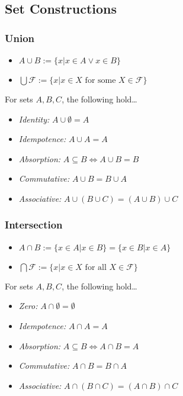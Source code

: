 \subsection{Set Constructions}\label{setconstructions}

\subsubsection{Union}\label{union}
\begin{itemize}
  \item $A\cup B := \{x | x \in A \lor x \in B \}$
  \item $\bigcup \mathcal{F} := \{x | x \in X \textrm{ for some } X \in \mathcal{F} \}$
\end{itemize}

\begin{proposition}
For sets $A,B,C$, the following hold\dots
\begin{itemize}
  \item \emph{Identity:} $A \cup \emptyset = A$
  \item \emph{Idempotence:} $A\cup A = A$
  \item \emph{Absorption:} $A \subseteq B \Leftrightarrow A \cup B = B$
  \item \emph{Commutative:} $A \cup B = B \cup A$
  \item \emph{Associative:} $A \cup (B \cup C) = (A \cup B) \cup C$
\end{itemize}
\end{proposition}
	
\subsubsection{Intersection}\label{intersection}
\begin{itemize}
  \item $A\cap B := \{x \in A | x \in B\} = \{x \in B | x \in A\}$
  \item $\bigcap \mathcal{F} := \{x | x \in X \textrm{ for all } X \in \mathcal{F} \}$
\end{itemize}

\begin{proposition}
For sets $A,B,C$, the following hold\dots
\begin{itemize}
  \item \emph{Zero:} $A \cap \emptyset = \emptyset$
  \item \emph{Idempotence:} $A\cap A = A$
  \item \emph{Absorption:} $A \subseteq B \Leftrightarrow A \cap B = A$
  \item \emph{Commutative:} $A \cap B = B \cap A$
  \item \emph{Associative:} $A \cap (B \cap C) = (A \cap B) \cap C$
\end{itemize}
\end{proposition}



